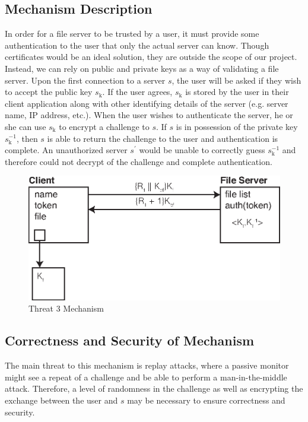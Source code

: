 \documentclass[11pt]{article}
\begin{document}
\subsection{Mechanism Description}
In order for a file server to be trusted by a user, it must provide some authentication to the user that only the actual server can know. Though certificates would be an ideal solution, they are outside the scope of our project. Instead, we can rely on public and private keys as a way of validating a file server. Upon the first connection to a server $s$, the user will be asked if they wish to accept the public key $s_\text{k}$. If the user agrees, $s_\text{k}$ is stored by the user in their client application along with other identifying details of the server (e.g. server name, IP address, etc.). When the user wishes to authenticate the server, he or she can use $s_\text{k}$ to encrypt a challenge to $s$. If $s$ is in possession of the private key $s_\text{k}^{-1}$, then $s$ is able to return the challenge to the user and authentication is complete. An unauthorized server $s^\prime$ would be unable to correctly guess $s_\text{k}^{-1}$ and therefore could not decrypt of the challenge and complete authentication.
\begin{figure}[htbp]
\begin{center}
\includegraphics{threat3.eps}
\caption{Threat 3 Mechanism}
\label{threat3}
\end{center}
\end{figure}
\subsection{Correctness and Security of Mechanism}
The main threat to this mechanism is replay attacks, where a passive monitor might see a repeat of a challenge and be able to perform a man-in-the-middle attack. Therefore, a level of randomness in the challenge as well as encrypting the exchange between the user and $s$ may be necessary to ensure correctness and security.
\end{document}
